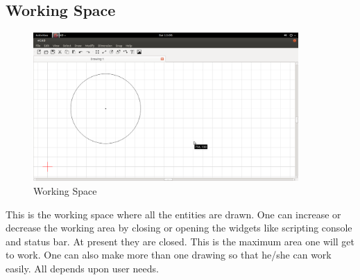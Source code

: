\subsection{Working Space}
\begin{figure}[h!]
\centering
\includegraphics[width=0.9\textwidth]{images/drawingarea.png} 
\caption{Working Space}
\end{figure}
This is the working space where all the entities are drawn. One can increase or decrease the working area by closing or opening the widgets like scripting console and status bar. At present they are closed. This is the maximum area one will get to work. One can also make more than one drawing so that he/she can work easily. All depends upon user needs.
